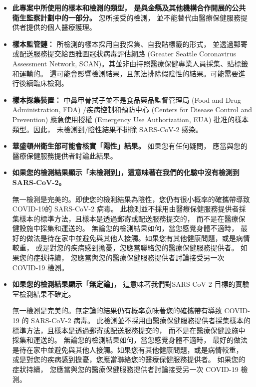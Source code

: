 \documentclass[10pt]{article}
\begin{document}
\begin{itemize}
\item

  \textbf{此專案中所使用的樣本和檢測的類型，
  是與金縣及其他機構合作開展的公共衛生監察計劃中的一部分。} 您所接受的檢測，
  並不能替代由醫療保健服務提供者提供的個人醫療護理。

\item

  \textbf{樣本監管鏈：} 所檢測的樣本採用自我採集、自我貼標籤的形式，
  並透過郵寄或配送服務提交給西雅圖冠狀病毒評估網路 (Greater Seattle Coronavirus
  Assessment Network, SCAN)。其並非由持照醫療保健專業人員採集、貼標籤和運輸的。
  這可能會影響檢測結果，且無法排除假陰性的結果。可能需要進行後續臨床檢測。

\item

  \textbf{樣本採集裝置：} 中鼻甲骨拭子並不是食品藥品監督管理局 (Food and Drug
  Administration, FDA) /疾病控制和預防中心 (Centers for Disease Control and
  Prevention) 應急使用授權 (Emergency Use Authorization, EUA) 批准的樣本類型。因此，
  未檢測到/陰性結果不排除 SARS-CoV-2 感染。

\item

  \textbf{華盛頓州衛生部可能會核實「陽性」結果。} 如果您有任何疑問，
  應當與您的醫療保健服務提供者討論此結果。

\item{
  \textbf{如果您的檢測結果顯示「未檢測到」，這意味著在我們的化驗中沒有檢測到 SARS-CoV-2。}

  無一檢測是完美的。即使您的檢測結果為陰性，您仍有很小概率的確攜帶導致COVID-19的 SARS-CoV-2
  病毒。 此檢測並不採用由醫療保健服務提供者採集樣本的標準方法，且樣本是透過郵寄或配送服務提交的，
  而不是在醫療保健設施中採集和運送的。 無論您的檢測結果如何，當您感覺身體不適時，
  最好的做法是待在家中並避免與其他人接觸。如果您有其他健康問題，或是病情較重，
  或是對您的疾病感到擔憂，您應當聯絡您的醫療保健服務提供者。 如果您的症狀持續，
  您應當與您的醫療保健服務提供者討論接受另一次 COVID-19 檢測。
}

\item

  \textbf{如果您的檢測結果顯示「無定論」，} 這意味著我們對SARS-CoV-2
  目標的實驗室檢測結果不確定。

  無一檢測是完美的。無定論的結果仍有概率意味著您的確攜帶有導致 COVID-19 的 SARS-CoV-2 病毒。
  此檢測並不採用由醫療保健服務提供者採集樣本的標準方法，且樣本是透過郵寄或配送服務提交的，
  而不是在醫療保健設施中採集和運送的。 無論您的檢測結果如何，當您感覺身體不適時，
  最好的做法是待在家中並避免與其他人接觸。如果您有其他健康問題，或是病情較重，
  或是對您的疾病感到擔憂，您應當聯絡您的醫療保健服務提供者。 如果您的症狀持續，
  您應當與您的醫療保健服務提供者討論接受另一次 COVID-19 檢測。


\end{itemize}
\end{document}
